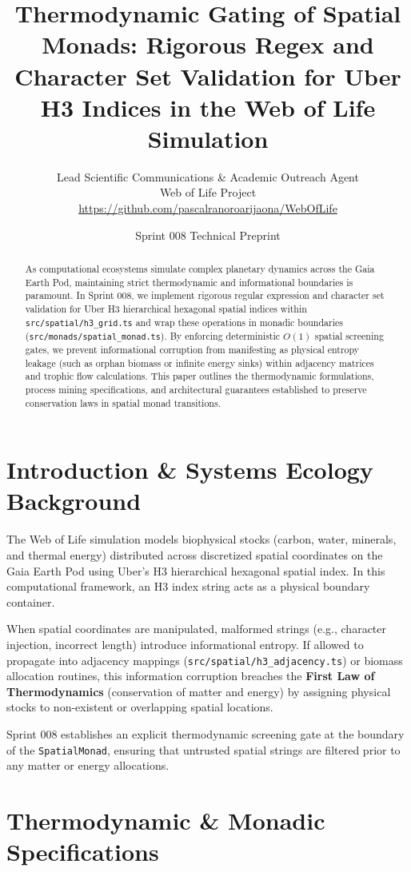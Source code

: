 \documentclass[11pt, a4paper]{article}
\title{\textbf{Thermodynamic Gating of Spatial Monads: Rigorous Regex and Character Set Validation for Uber H3 Indices in the Web of Life Simulation}}
\author{Lead Scientific Communications \& Academic Outreach Agent \\ Web of Life Project \\ \url{https://github.com/pascalranoroarijaona/WebOfLife}}
\date{Sprint 008 Technical Preprint}
\begin{document}
\maketitle

\begin{abstract}
As computational ecosystems simulate complex planetary dynamics across the Gaia Earth Pod, maintaining strict thermodynamic and informational boundaries is paramount. In Sprint 008, we implement rigorous regular expression and character set validation for Uber H3 hierarchical hexagonal spatial indices within \texttt{src/spatial/h3\_grid.ts} and wrap these operations in monadic boundaries (\texttt{src/monads/spatial\_monad.ts}). By enforcing deterministic $O(1)$ spatial screening gates, we prevent informational corruption from manifesting as physical entropy leakage (such as orphan biomass or infinite energy sinks) within adjacency matrices and trophic flow calculations. This paper outlines the thermodynamic formulations, process mining specifications, and architectural guarantees established to preserve conservation laws in spatial monad transitions.
\end{abstract}

\section{Introduction \& Systems Ecology Background}
The Web of Life simulation models biophysical stocks (carbon, water, minerals, and thermal energy) distributed across discretized spatial coordinates on the Gaia Earth Pod using Uber's H3 hierarchical hexagonal spatial index. In this computational framework, an H3 index string acts as a physical boundary container. 

When spatial coordinates are manipulated, malformed strings (e.g., character injection, incorrect length) introduce informational entropy. If allowed to propagate into adjacency mappings (\texttt{src/spatial/h3\_adjacency.ts}) or biomass allocation routines, this information corruption breaches the \textbf{First Law of Thermodynamics} (conservation of matter and energy) by assigning physical stocks to non-existent or overlapping spatial locations.

Sprint 008 establishes an explicit thermodynamic screening gate at the boundary of the \texttt{SpatialMonad}, ensuring that untrusted spatial strings are filtered prior to any matter or energy allocations.

\section{Thermodynamic \& Monadic Specifications}
\end{document}
